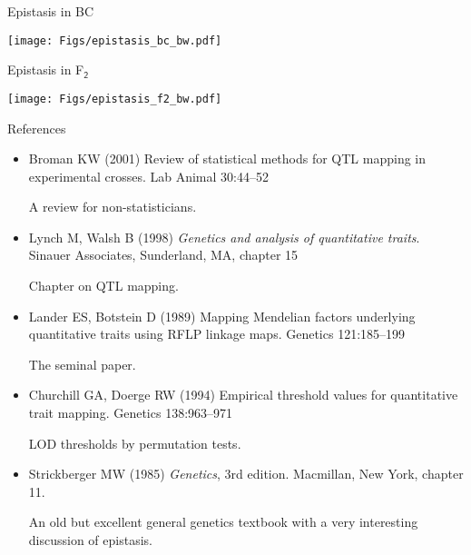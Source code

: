 \documentclass[12pt]{article}
\newcommand{\headsize}{\fontsize{35}{35} \selectfont}
\newcommand{\smallestsize}{\fontsize{18}{22} \selectfont}
\begin{document}
\newpage

\headsize \color{myyellow}
\hfill \begin{minipage}{5.75in}
\centering
Epistasis in BC
\end{minipage}

\vfill

\centerline{\texttt{[image: Figs/epistasis\_bc\_bw.pdf]}}


\newpage

\headsize \color{myyellow}
\hfill \begin{minipage}{5.75in}
\centering
Epistasis in F$_{\mathsf{2}}$
\end{minipage}

\vfill

\centerline{\texttt{[image: Figs/epistasis\_f2\_bw.pdf]}}






\newpage

\headsize \color{myyellow}
\hfill \begin{minipage}{5.75in}
\centering
References
\end{minipage}

\vspace{15mm}

\color{mywhite} \smallestsize

\hspace*{0.5in}
\begin{minipage}{9.5in}
\begin{itemize}
\itemsep12pt
\item Broman KW (2001) Review of statistical methods for QTL mapping in
experimental crosses. Lab Animal 30:44--52

{\color{myblue} A review for non-statisticians.}

\item Lynch M, Walsh B (1998) \emph{Genetics and analysis of quantitative
traits}. Sinauer Associates, Sunderland, MA, chapter 15

{\color{myblue} Chapter on QTL mapping.}

\item Lander ES, Botstein D (1989) Mapping Mendelian factors underlying
quantitative traits using RFLP linkage maps. Genetics
121:185--199

{\color{myblue} The seminal paper.}

\item Churchill GA, Doerge RW (1994) Empirical threshold values for
quantitative trait mapping. Genetics 138:963--971

{\color{myblue} LOD thresholds by permutation tests.}

\item Strickberger MW (1985) \emph{Genetics}, 3rd edition.  Macmillan,
New York, chapter 11.

{\color{myblue} An old but excellent general genetics textbook with a very
interesting discussion of epistasis.}


\end{itemize}
\end{minipage}
\end{document}
